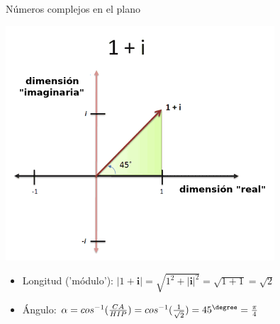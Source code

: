 \documentclass[10pt]{beamer}
\def\ii{\textbf{i}}
\def\m{^{-1}}
\begin{document}
\begin{frame}{Números complejos en el plano}

	\includegraphics[scale=0.8]{1plusi.png}
	
	
	
	\begin{itemize}
	
		\item Longitud ('módulo'): $|1+\ii| = \sqrt{1^2 + |\ii|^2} = \sqrt{1+1} = \sqrt{2}$

		\item Ángulo: $\alpha = cos\m(\frac{CA}{HIP}) = cos\m(\frac{1}{\sqrt{2}}) = 45^\degree = \frac{\pi}{4}$
	\end{itemize}
\end{frame}
\end{document}
